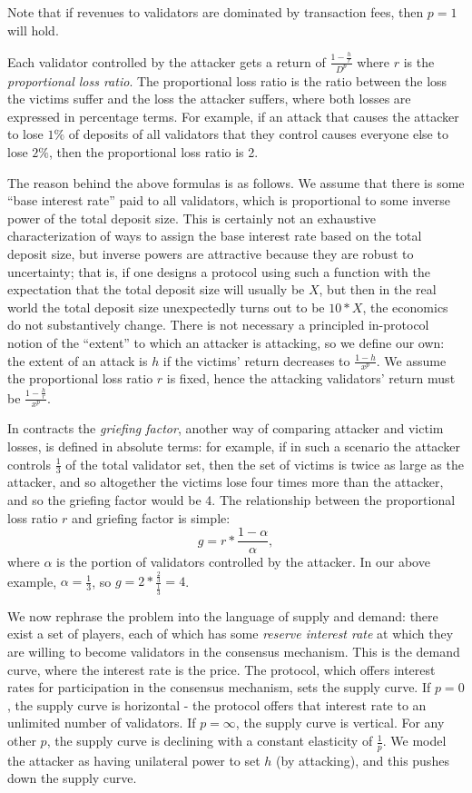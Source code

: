 \documentclass[12pt]{article}
\begin{document}
Note that if revenues to validators are dominated by transaction fees, then $p=1$ will hold.

Each validator controlled by the attacker gets a return of $\frac{1-\frac{h}{r}}{D^p}$ where $r$ is the \textit{proportional loss ratio}. The proportional loss ratio is the ratio between the loss the victims suffer and the loss the attacker suffers, where both losses are expressed in percentage terms. For example, if an attack that causes the attacker to lose $1\%$ of deposits of all validators that they control causes everyone else to lose $2\%$, then the proportional loss ratio is 2.

The reason behind the above formulas is as follows. We assume that there is some ``base interest rate'' paid to all validators, which is proportional to some inverse power of the total deposit size. This is certainly not an exhaustive characterization of ways to assign the base interest rate based on the total deposit size, but inverse powers are attractive because they are robust to uncertainty; that is, if one designs a protocol using such a function with the expectation that the total deposit size will usually be $X$, but then in the real world the total deposit size unexpectedly turns out to be $10 * X$, the economics do not substantively change. There is not necessary a principled in-protocol notion of the ``extent'' to which an attacker is attacking, so we define our own: the extent of an attack is $h$ if the victims' return decreases to $\frac{1-h}{x^p}$. We assume the proportional loss ratio $r$ is fixed, hence the attacking validators' return must be $\frac{1-\frac{h}{r}}{x^p}$.

In contracts the \textit{griefing factor}, another way of comparing attacker and victim losses, is defined in absolute terms: for example, if in such a scenario the attacker controls $\frac{1}{3}$ of the total validator set, then the set of victims is twice as large as the attacker, and so altogether the victims lose four times more than the attacker, and so the griefing factor would be 4. The relationship between the proportional loss ratio $r$ and griefing factor is simple: $$g = r * \frac{1-\alpha}{\alpha},$$ where $\alpha$ is the portion of validators controlled by the attacker. In our above example, $\alpha = \frac{1}{3}$, so $g = 2 * \frac{\frac{2}{3}}{\frac{1}{3}} = 4$.

We now rephrase the problem into the language of supply and demand: there exist a set of players, each of which has some \textit{reserve interest rate} at which they are willing to become validators in the consensus mechanism. This is the demand curve, where the interest rate is the price. The protocol, which offers interest rates for participation in the consensus mechanism, sets the supply curve. If $p=0$, the supply curve is horizontal - the protocol offers that interest rate to an unlimited number of validators. If $p=\infty$, the supply curve is vertical. For any other $p$, the supply curve is declining with a constant elasticity of $\frac{1}{p}$. We model the attacker as having unilateral power to set $h$ (by attacking), and this pushes down the supply curve.
\end{document}
